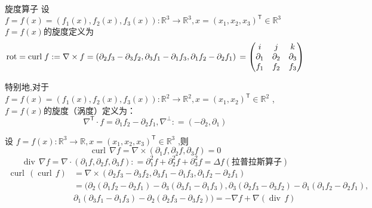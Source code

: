 \documentclass[../../PDE.tex]{subfiles}
\begin{document}
\begin{definition}{旋度算子}
    设 \(  f =  f\left( x \right) =  \left( f_1\left( x \right),f_2\left( x \right),f_3\left( x \right)    \right): \mathbb{R} ^{3}\to \mathbb{R} ^{3} ,x =  \left( x_1,x_2,x_3 \right)^{\mathsf{T}} \in \mathbb{R} ^{3}     \) 
    \(  f=  f\left( x \right)   \)的旋度定义为 \[
    \mathrm{rot} =  \mathrm{curl}\;f : =   \nabla \times f =  \left( \partial_{2} f_{3} - \partial _{3}f_2,\partial _{3}f_1-\partial _{1}f_3,\partial _{1}f_2-\partial _{2}f_1 \right) \\ 
     =  \begin{pmatrix} 
         i&j&k\\ 
          \partial _1&\partial _2&\partial _{3}\\ 
           f_1&f_2&f_3 
     \end{pmatrix} 
    \] 
    

    特别地,对于 \(  f =  f\left( x \right)= \left( f_1\left( x \right),f_2\left( x \right),f_3\left( x \right) \right)  : \mathbb{R} ^{2}\to \mathbb{R} ^{2},x =  \left( x_1,x_2 \right)^{\mathsf{T}}\in \mathbb{R} ^{2}     \) , \(  f =  f\left( x \right)   \)的旋度（涡度）定义为： \[
     \nabla ^{\mathsf{T}}\cdot f =  \partial _{1}f_2-\partial _{2}f_1, \nabla ^{\perp }: =  \left( -\partial _{2},\partial _{1} \right) 
    \] 
\end{definition}

\begin{proposition}
    设 \(  f= f\left( x \right):\mathbb{R} ^{3}\to \mathbb{R} ,x =  \left( x_1,x_2,x_3 \right)^{\mathsf{T}}\in \mathbb{R} ^{3}    \) ,则 \[
    \operatorname{curl}\, \nabla f =   \nabla \times \left( \partial _{1}f,\partial _{2}f,\partial _{3}f \right)= 0 
    \] \[
    \operatorname{div}\, \nabla f =   \nabla \cdot \left( \partial _{1}f,\partial _{2}f,\partial _{3}f \right): =  \partial _{1}^{2}f+ \partial _{2}^{2}f+ \partial _{3}^{2}f=  \Delta f  (\text{拉普拉斯算子} )
    \]   \[
    \begin{aligned}
        \operatorname{curl}\,\left( \operatorname{curl}\,f \right) & =   \nabla \times \left( \partial _{2}f_3-\partial _{3}f_2, \partial _{3}f_1-\partial _{1}f_3,\partial _{1}f_2-\partial _{2}f_1 \right)  \\ 
         & =  ( \partial _{2}\left( \partial _{1}f_2-\partial _{2}f_1 \right)-\partial _{3} \left( \partial _{3}f_1-\partial _{1}f_3 \right), \partial _{3}\left( \partial _{2}f_3-\partial _{3}f_2 \right)   -\partial _{1}\left( \partial _{1}f_2-\partial _{2}f_1 \right) ,\\ 
          & \partial _{1}\left( \partial _{3}f_1-\partial _{1}f_3 \right)-\partial _{2}\left( \partial _{2}f_3-\partial _{3}f_2 \right)) =  - \nabla f+  \nabla \left( \operatorname{div}\,f \right)   
    \end{aligned} 
    \]
\end{proposition}
\end{document}
